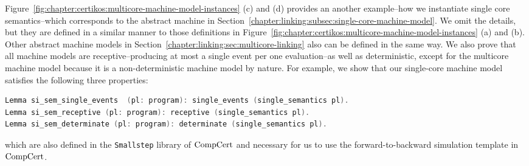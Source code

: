 Figure~\ref{fig:chapter:certikos:multicore-machine-model-instances} (c) and (d) provides an another example--how 
we instantiate single core semantics--which corresponds to the abstract machine in Section~\ref{chapter:linking:subsec:single-core-machine-model}.
We omit the details, but they are defined in a similar manner to those definitions in Figure~\ref{fig:chapter:certikos:multicore-machine-model-instances} (a) and (b). 
Other abstract machine models 
in Section~\ref{chapter:linking:sec:multicore-linking} also can be defined in
 the same way. 
We also prove that all machine models 
are receptive--producing at most a single event per one evaluation--as well as deterministic, 
except for the multicore machine model because it is a non-deterministic machine model by nature.
For example, 
we show that
our single-core machine model satisfies the following three properties:
\begin{lstlisting}[language=C]
Lemma si_sem_single_events  (pl: program): single_events (single_semantics pl).
Lemma si_sem_receptive (pl: program): receptive (single_semantics pl).
Lemma si_sem_determinate (pl: program): determinate (single_semantics pl).
\end{lstlisting}
which are also defined in  the \lstinline$Smallstep$ library of $\mathrm{CompCert}$ and
necessary for us to use 
the forward-to-backward simulation template in $\mathrm{CompCert}$. 

%
%
%

%    
%    

